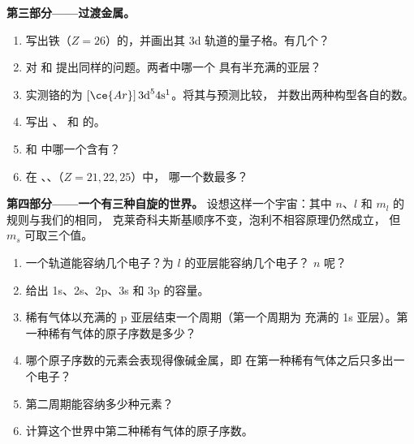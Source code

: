 \begin{problem}
\medskip
\noindent\textbf{第三部分——过渡金属。}
\begin{enumerate}[resume]
  \item 写出铁（$Z = 26$）的，并画出其
        3d 轨道的量子格。有几个？
  \item 对  和  提出同样的问题。两者中哪一个
        具有半充满的亚层？
  \item 实测铬的为 $[\ce{Ar}]\,3\text{d}^5
        4\text{s}^1$。将其与预测比较，
        并数出两种构型各自的数。
  \item 写出 、 和  的。
  \item {} 和  中哪一个含有？
  \item 在 、、（$Z = 21, 22, 25$）中，
        哪一个数最多？
\end{enumerate}

\medskip
\noindent\textbf{第四部分——一个有三种自旋的世界。}
设想这样一个宇宙：其中 $n$、$l$ 和 $m_l$ 的规则与我们的相同，
克莱奇科夫斯基顺序不变，泡利不相容原理仍然成立，
但 $m_s$ 可取三个值。
\begin{enumerate}[resume]
  \item 一个轨道能容纳几个电子？为
        $l$ 的亚层能容纳几个电子？ $n$ 呢？
  \item 给出 1s、2s、2p、3s 和 3p 的容量。
  \item 稀有气体以充满的 p 亚层结束一个周期（第一个周期为
        充满的 1s 亚层）。第一种稀有气体的原子序数是多少？
  \item 哪个原子序数的元素会表现得像碱金属，即
        在第一种稀有气体之后只多出一个电子？
  \item 第二周期能容纳多少种元素？
  \item 计算这个世界中第二种稀有气体的原子序数。
\end{enumerate}
\end{problem}

